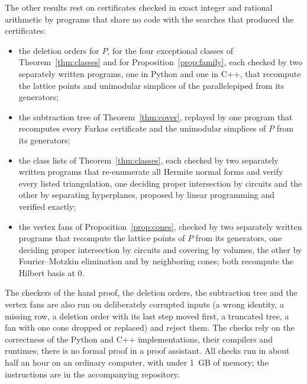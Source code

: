 \documentclass[11pt]{article}
\theoremstyle{definition}
\begin{document}
The other results rest on certificates checked in exact integer and
rational arithmetic by programs that share no code with the searches that
produced the certificates:
\begin{itemize}
\item the deletion orders for $P$, for the four exceptional classes of
Theorem~\ref{thm:classes} and for Proposition~\ref{prop:family}, each
checked by two separately written programs, one in Python and one in C++,
that recompute the lattice points and unimodular simplices of the
parallelepiped from its generators;
\item the subtraction tree of Theorem~\ref{thm:cover}, replayed by one
program that recomputes every Farkas certificate and the unimodular
simplices of $P$ from its generators;
\item the class lists of Theorem~\ref{thm:classes}, each checked by two
separately written programs that re-enumerate all Hermite normal forms and
verify every listed triangulation, one deciding proper intersection by
circuits and the other by separating hyperplanes, proposed by linear
programming and verified exactly;
\item the vertex fans of Proposition~\ref{prop:cones}, checked by two
separately written programs that recompute the lattice points of $P$ from
its generators, one deciding proper intersection by circuits and covering
by volumes, the other by Fourier--Motzkin elimination and by neighboring
cones; both recompute the Hilbert basis at $0$.
\end{itemize}
The checkers of the hand proof, the deletion orders, the subtraction tree
and the vertex fans are also run on deliberately corrupted inputs (a wrong
identity, a missing row, a deletion order with its last step moved first, a
truncated tree, a fan with one cone dropped or replaced) and reject them.
The checks rely on the correctness of the Python and C++ implementations,
their compilers and runtimes; there is no formal proof in a proof
assistant. All checks run in about half an hour on an ordinary computer,
with under 1~GB of memory; the instructions are in the accompanying
repository.
\end{document}

